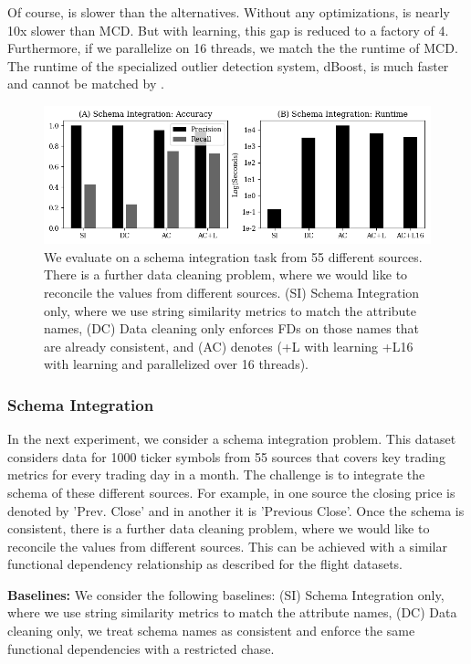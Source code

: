 Of course, \sys is slower than the alternatives. 
Without any optimizations, \sys is nearly 10x slower than MCD.
But with learning, this gap is reduced to a factory of 4.
Furthermore, if we parallelize on 16 threads, we match the the runtime of MCD.
The runtime of the specialized outlier detection system, dBoost, is much faster and cannot be matched by \sys.

\begin{figure}
    \centering
    \includegraphics[width=\columnwidth]{exp/exp3.png}
    \caption{We evaluate \sys on a schema integration task from 55 different sources. There is a further data cleaning problem, where we would like to reconcile the values from different sources.
    (SI) Schema Integration only, where we use string similarity metrics to match the attribute names, (DC) Data cleaning only enforces FDs on those names that are already consistent, and  (AC) denotes \sys (+L with learning +L16 with learning and parallelized over 16 threads). \label{exp3a}}
\end{figure}

\subsubsection{Schema Integration}
In the next experiment, we consider a schema integration problem. This dataset considers data for 1000 ticker symbols from 55 sources that covers key trading metrics for every trading day in a month.
The challenge is to integrate the schema of these different sources. For example,
in one source the closing price is denoted by 'Prev. Close' and in another it is 'Previous Close'.
Once the schema is consistent, there is a further data cleaning problem, where we would like to reconcile the values from different sources. This can be achieved with a similar functional dependency relationship as described for the flight datasets.

\vspace{0.5em}\noindent\textbf{Baselines: } We consider the following baselines: (SI) Schema Integration only, where we use string similarity metrics to match the attribute names, (DC) Data cleaning only, we treat schema names as consistent and enforce the same functional dependencies with a restricted chase.

